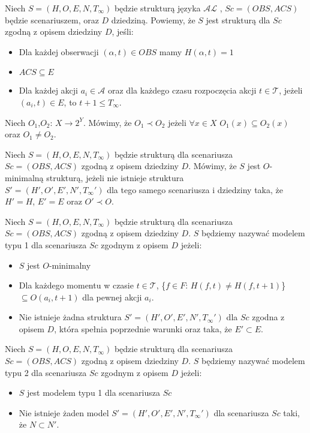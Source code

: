    \begin{definition}
   Niech $S = (H,O,E,N,T_{\infty})$ będzie strukturą języka $\mathcal{AL}$ , $ Sc=(OBS,ACS) $ będzie scenariuszem,
    oraz $ D $ dziedziną. Powiemy, że $ S $ jest strukturą dla $Sc$ zgodną z opisem dziedziny $D$, jeśli:
   		\begin{itemize}
     		\item Dla każdej obserwacji $(\alpha,t )\in OBS$ mamy $H(\alpha,t )=1$
     		\item $ACS \subseteq E$
     		\item Dla każdej akcji $ {a_i \in \mathcal{A}}$ oraz dla każdego czasu rozpoczęcia akcji
     		$t \in \mathcal{T}$, jeżeli $(a_i,t) \in E $, to $t+1 \leq T_{\infty}$.
    		\end{itemize}
   \end{definition}
   \begin{definition}
	   Niech $O_{1}$,$O_{2}$: $X \longrightarrow 2^{Y}$. Mówimy, że $O_{1} \prec O_{2}$ jeżeli
	   $\forall x\in X$ $O_{1}(x)\subseteq O_{2}(x)$ oraz $O_{1}\neq O_{2}$.
   \end{definition}

   \begin{definition}
   Niech $S=(H,O,E,N,T_{\infty})$ będzie strukturą dla scenariusza $Sc=(OBS,ACS)$ zgodną z opisem dziedziny
   $D$. Mówimy, że $S$ jest $O$-minimalną strukturą, jeżeli nie istnieje struktura \\$S'=(H',O',E',N',T_{\infty}')$
   dla tego samego scenariusza i dziedziny taka, że $H'=H$, $E'=E$ oraz $O'\prec O$.
   \end{definition}
   \begin{definition}
   Niech $S=(H,O,E,N,T_{\infty})$ będzie strukturą dla scenariusza $Sc=(OBS,ACS)$ zgodną z opisem dziedziny
   $D$. $S$ będziemy nazywać modelem typu 1 dla scenariusza $Sc$ zgodnym z opisem $D$ jeżeli:
   \begin{itemize}
		\item $S$ jest $O$-minimalny
		\item Dla każdego momentu w czasie $t \in \mathcal{T}$,  \{$f\in F$: $H(f,t)\neq H(f,t+1) $\}
		$\subseteq O(a_i,t+1)$ dla pewnej akcji $a_i$.
		\item Nie istnieje żadna struktura $S'=(H',O',E',N',T_{\infty}')$ dla $Sc$ zgodna z opisem $D$,
		która spełnia poprzednie warunki oraz taka, że $E'\subset E$.
	\end{itemize}
\end{definition}
\begin{definition}
   Niech $S=(H,O,E,N,T_{\infty})$ będzie strukturą dla scenariusza $Sc=(OBS,ACS)$ zgodną z opisem dziedziny
   $D$. $S$ będziemy nazywać modelem typu 2 dla scenariusza $Sc$ zgodnym z opisem $D$ jeżeli:
   \begin{itemize}
		\item $S$ jest modelem typu 1 dla scenariusza $Sc$
		\item Nie istnieje żaden model $S'=(H',O',E',N',T_{\infty}')$ dla scenariusza $Sc$ taki, że $N \subset N'$.
   \end{itemize}
\end{definition}

